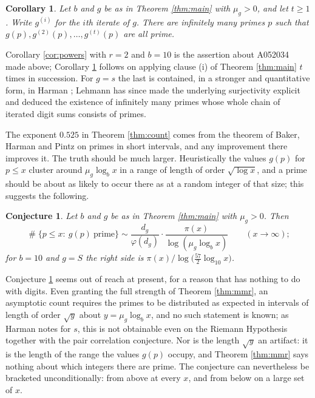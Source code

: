 \documentclass[11pt,reqno]{amsart}
\theoremstyle{plain}
\newtheorem{corollary}[theorem]{Corollary}
\newtheorem{conjecture}[theorem]{Conjecture}
\theoremstyle{definition}
\DeclareMathOperator{\Card}{\#}
\begin{document}
\begin{corollary}\label{cor:iter}
Let $b$ and $g$ be as in Theorem \ref{thm:main} with $\mu_g>0$, and let $t\ge1$. Write $g^{(i)}$ for the $i$th iterate of $g$. There are infinitely many primes $p$ such that $g(p),g^{(2)}(p),\dots,g^{(t)}(p)$ are all prime.
\end{corollary}

Corollary \ref{cor:powers} with $r=2$ and $b=10$ is the assertion about A052034 made above; Corollary \ref{cor:iter} follows on applying clause (i) of Theorem \ref{thm:main} $t$ times in succession. For $g=s$ the last is contained, in a stronger and quantitative form, in Harman \cite{harman}; Lehmann \cite{lehmann} has since made the underlying surjectivity explicit and deduced the existence of infinitely many primes whose whole chain of iterated digit sums consists of primes.

The exponent $0.525$ in Theorem \ref{thm:count} comes from the theorem of Baker, Harman and Pintz \cite{bhp} on primes in short intervals, and any improvement there improves it. The truth should be much larger. Heuristically the values $g(p)$ for $p\le x$ cluster around $\mu_g\log_bx$ in a range of length of order $\sqrt{\log x}$, and a prime should be about as likely to occur there as at a random integer of that size; this suggests the following.

\begin{conjecture}\label{conj}
Let $b$ and $g$ be as in Theorem \ref{thm:main} with $\mu_g>0$. Then
\[
\Card\{p\le x:\ g(p)\ \text{prime}\}\sim \frac{d_g}{\varphi(d_g)}\cdot\frac{\pi(x)}{\log(\mu_g\log_bx)}\qquad(x\to\infty);
\]
for $b=10$ and $g=S$ the right side is $\pi(x)/\log\big(\tfrac{57}{2}\log_{10}x\big)$.
\end{conjecture}

Conjecture \ref{conj} seems out of reach at present, for a reason that has nothing to do with digits. Even granting the full strength of Theorem \ref{thm:mmr}, an asymptotic count requires the primes to be distributed as expected in intervals of length of order $\sqrt{y}$ about $y=\mu_g\log_bx$, and no such statement is known; as Harman notes for $s$, this is not obtainable even on the Riemann Hypothesis together with the pair correlation conjecture. Nor is the length $\sqrt y$ an artifact: it is the length of the range the values $g(p)$ occupy, and Theorem \ref{thm:mmr} says nothing about which integers there are prime. The conjecture can nevertheless be bracketed unconditionally: from above at every $x$, and from below on a large set of $x$.
\end{document}
